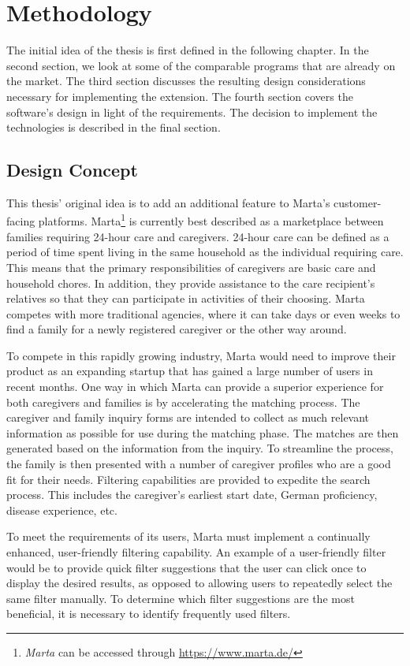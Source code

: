\newpage
\chapter{Methodology}
The initial idea of the thesis is first defined in the following chapter. In the second section, we look at some of the comparable programs that are already on the market. The third section discusses the resulting design considerations necessary for implementing the extension. The fourth section covers the software's design in light of the requirements. The decision to implement the technologies is described in the final section.

\section{Design Concept}
This thesis' original idea is to add an additional feature to Marta's customer-facing platforms. Marta\footnote{\emph{Marta} can be accessed through \url{https://www.marta.de/}} is currently best described as a marketplace between families requiring 24-hour care and caregivers. 24-hour care can be defined as a period of time spent living in the same household as the individual requiring care. This means that the primary responsibilities of caregivers are basic care and household chores. In addition, they provide assistance to the care recipient's relatives so that they can participate in activities of their choosing. Marta competes with more traditional agencies, where it can take days or even weeks to find a family for a newly registered caregiver or the other way around.

To compete in this rapidly growing industry, Marta would need to improve their product as an expanding startup that has gained a large number of users in recent months. One way in which Marta can provide a superior experience for both caregivers and families is by accelerating the matching process. The caregiver and family inquiry forms are intended to collect as much relevant information as possible for use during the matching phase. The matches are then generated based on the information from the inquiry. To streamline the process, the family is then presented with a number of caregiver profiles who are a good fit for their needs. Filtering capabilities are provided to expedite the search process. This includes the caregiver's earliest start date, German proficiency, disease experience, etc.

To meet the requirements of its users, Marta must implement a continually enhanced, user-friendly filtering capability. An example of a user-friendly filter would be to provide quick filter suggestions that the user can click once to display the desired results, as opposed to allowing users to repeatedly select the same filter manually. To determine which filter suggestions are the most beneficial, it is necessary to identify frequently used filters.

